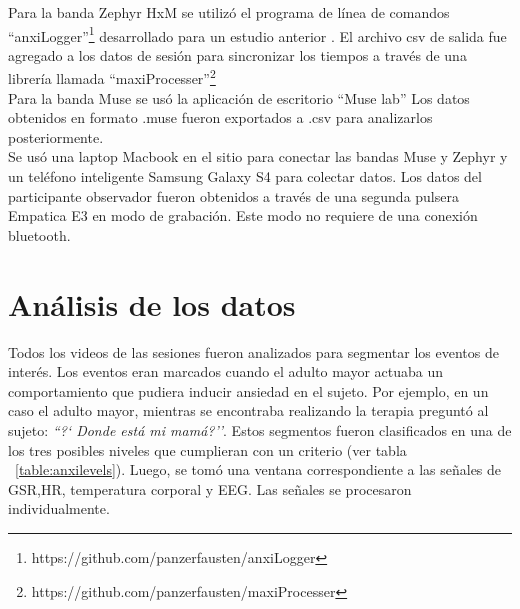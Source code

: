 Para la banda Zephyr HxM se utiliz\'o el programa de l\'inea de comandos ``anxiLogger''\footnote{https://github.com/panzerfausten/anxiLogger} desarrollado para un estudio anterior \citep{Miranda}. El archivo csv de salida fue agregado a los datos de sesi\'on para sincronizar los tiempos a trav\'es de una librer\'ia llamada ``maxiProcesser''\footnote{https://github.com/panzerfausten/maxiProcesser}
\\
Para la banda Muse se us\'o la aplicaci\'on de escritorio ``Muse lab'' Los datos obtenidos en formato .muse fueron exportados a .csv para analizarlos posteriormente.
\\
Se us\'o una laptop Macbook en el sitio para conectar las bandas Muse y Zephyr y un tel\'efono inteligente Samsung Galaxy S4 para colectar datos. Los datos del participante observador fueron obtenidos a trav\'es de una segunda pulsera Empatica E3 en modo de grabaci\'on. Este modo no requiere de una conexi\'on bluetooth.

\section{An\'alisis de los datos}\label{secc:dataanalysis}
Todos los videos de las sesiones fueron analizados para segmentar los eventos de inter\'es. Los eventos eran marcados cuando el adulto mayor actuaba un comportamiento que pudiera inducir ansiedad en el sujeto. Por ejemplo, en un caso el adulto mayor, mientras se encontraba realizando la terapia pregunt\'o al sujeto: \textit{``?` Donde est\'a mi mam\'a?''}. Estos segmentos fueron clasificados en una de los tres posibles niveles que cumplieran con un criterio (ver tabla ~\ref{table:anxilevels}). Luego, se tom\'o una ventana correspondiente a las se\~nales de GSR,HR, temperatura corporal y EEG. Las se\~nales se procesaron individualmente.


